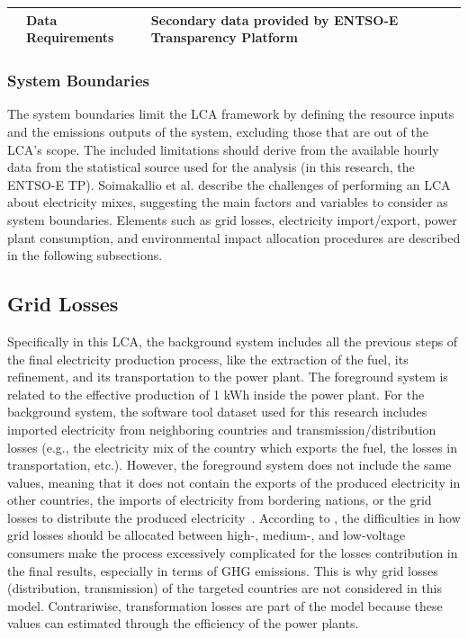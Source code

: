 {\begin{table}[htbp]
{\begin{tabular}{lll}
                                \\ \cline{2-3} 
                                & \textbf{Data Requirements}         & Secondary data provided by ENTSO-E Transparency Platform                                                                                                                   \\ \bottomrule
  \end{tabular}                              
\label{screeninglca}
}
\end{table}


\subsubsection{System Boundaries} \label{SB}
The system boundaries limit the LCA framework by defining the resource inputs and the emissions outputs of the system, excluding those that are out of the LCA's scope. The included limitations should derive from the available hourly data from the statistical source used for the analysis (in this research, the ENTSO-E TP). Soimakallio et al. \cite{Soimakallio2011} describe the challenges of performing an LCA about electricity mixes, suggesting the main factors and variables to consider as system boundaries. Elements such as grid losses, electricity import/export, power plant consumption, and environmental impact allocation procedures are described in the following subsections. 

\subsection*{Grid Losses} 
Specifically in this LCA, the background system includes all the previous steps of the final electricity production process, like the extraction of the fuel, its refinement, and its transportation to the power plant. The foreground system is related to the effective production of 1 kWh inside the power plant. For the background system, the software tool dataset used for this research includes imported electricity from neighboring countries and transmission/distribution losses (e.g., the electricity mix of the country which exports the fuel, the losses in transportation, etc.). However, the foreground system does not include the same values, meaning that it does not contain the exports of the produced electricity in other countries, the imports of electricity from bordering nations, or the grid losses to distribute the produced electricity~\cite{PEInternational2014GaBiV6}. According to \cite{Soimakallio2011}, the difficulties in how  grid losses should be allocated between high-, medium-, and low-voltage consumers make the process excessively complicated for the losses contribution in the final results, especially in terms of GHG emissions. This is why grid losses (distribution, transmission) of the targeted countries are not considered in this model. Contrariwise, transformation losses are part of the model because these values can estimated through the efficiency of the power plants. 

}
